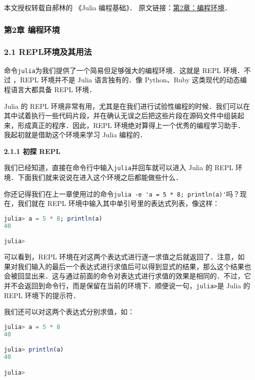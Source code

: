 
本文授权转载自郝林的 《Julia 编程基础》． 原文链接：\href{https://github.com/hyper0x/JuliaBasics/blob/master/book/ch02.md}{第2章：编程环境}．


\subsubsection{第2章  编程环境}

\subsubsection{2.1 REPL环境及其用法}

命令\verb|julia|为我们提供了一个简易但足够强大的编程环境．这就是 REPL 环境．不过
，REPL 环境并不是 Julia 语言独有的．像 Python、Ruby 这类现代的动态编程语言大都具备 REPL 环境．

Julia 的 REPL 环境非常有用，尤其是在我们进行试验性编程的时候．我们可以在其中试着执行一些代码片段，并在确认无误之后把这些片段在源码文件中组装起来，形成真正的程序．因此，REPL 环境绝对算得上一个优秀的编程学习助手．我起初就是借助这个环境来学习 Julia 编程的．

\textbf{2.1.1 初探 REPL}

我们已经知道，直接在命令行中输入\verb|julia|并回车就可以进入 Julia 的 REPL 环境．下面我们就来说说在进入这个环境之后都能做些什么．

你还记得我们在上一章使用过的命令\verb|julia -e 'a = 5 * 8; println(a)'|吗？现在，我们就在 REPL 环境中输入其中单引号里的表达式列表，像这样：

\begin{lstlisting}[language=julia]
julia> a = 5 * 8; println(a)
40

julia>
\end{lstlisting}

可以看到，REPL 环境在对这两个表达式进行逐一求值之后就返回了．注意，如果对我们输入的最后一个表达式进行求值后可以得到显式的结果，那么这个结果也会被回显出来．这与通过前面的命令对表达式进行求值的效果是相同的．不过，它并不会返回到命令行，而是保留在当前的环境下．顺便说一句，\verb|julia>|是 Julia 的 REPL 环境下的提示符．

我们还可以对这两个表达式分别求值，如：

\begin{lstlisting}[language=julia]
julia> a = 5 * 8
40

julia> println(a)
40

julia> 
\end{lstlisting}


